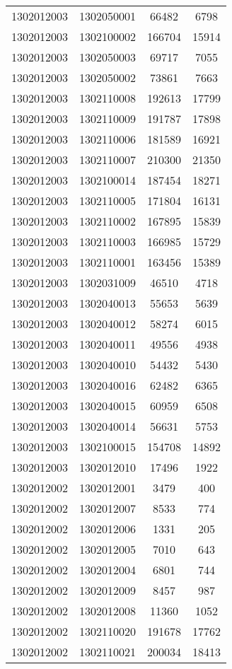 \begin{longtable}[h]{llcc}
		1302012003 & 1302050001 & 66482 & 6798\\
		1302012003 & 1302100002 & 166704 & 15914\\
		1302012003 & 1302050003 & 69717 & 7055\\
		1302012003 & 1302050002 & 73861 & 7663\\
		1302012003 & 1302110008 & 192613 & 17799\\
		1302012003 & 1302110009 & 191787 & 17898\\
		1302012003 & 1302110006 & 181589 & 16921\\
		1302012003 & 1302110007 & 210300 & 21350\\
		1302012003 & 1302100014 & 187454 & 18271\\
		1302012003 & 1302110005 & 171804 & 16131\\
		1302012003 & 1302110002 & 167895 & 15839\\
		1302012003 & 1302110003 & 166985 & 15729\\
		1302012003 & 1302110001 & 163456 & 15389\\
		1302012003 & 1302031009 & 46510 & 4718\\
		1302012003 & 1302040013 & 55653 & 5639\\
		1302012003 & 1302040012 & 58274 & 6015\\
		1302012003 & 1302040011 & 49556 & 4938\\
		1302012003 & 1302040010 & 54432 & 5430\\
		1302012003 & 1302040016 & 62482 & 6365\\
		1302012003 & 1302040015 & 60959 & 6508\\
		1302012003 & 1302040014 & 56631 & 5753\\
		1302012003 & 1302100015 & 154708 & 14892\\
		1302012003 & 1302012010 & 17496 & 1922\\
		1302012002 & 1302012001 & 3479 & 400\\
		1302012002 & 1302012007 & 8533 & 774\\
		1302012002 & 1302012006 & 1331 & 205\\
		1302012002 & 1302012005 & 7010 & 643\\
		1302012002 & 1302012004 & 6801 & 744\\
		1302012002 & 1302012009 & 8457 & 987\\
		1302012002 & 1302012008 & 11360 & 1052\\
		1302012002 & 1302110020 & 191678 & 17762\\
		1302012002 & 1302110021 & 200034 & 18413\\

\end{longtable}
